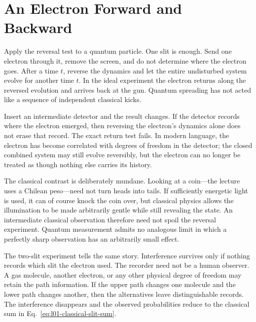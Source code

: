 \section{An Electron Forward and Backward}

Apply the reversal test to a quantum particle. One slit is enough. Send one
electron through it, remove the screen, and do not determine where the
electron goes. After a time \(t\), reverse the dynamics and let the entire
undisturbed system evolve for another time \(t\). In the ideal experiment the
electron returns along the reversed evolution and arrives back at the gun.
Quantum spreading has not acted like a sequence of independent classical
kicks.

Insert an intermediate detector and the result changes. If the detector
records where the electron emerged, then reversing the electron's dynamics
alone does not erase that record. The exact return test fails. In modern
language, the electron has become correlated with degrees of freedom in the
detector; the closed combined system may still evolve reversibly, but the
electron can no longer be treated as though nothing else carries its
history.

The classical contrast is deliberately mundane. Looking at a coin---the
lecture uses a Chilean peso---need not turn heads into tails. If sufficiently
energetic light is used, it can of course knock the coin over, but classical
physics allows the illumination to be made arbitrarily gentle while still
revealing the state. An intermediate classical observation therefore need
not spoil the reversal experiment. Quantum measurement admits no analogous
limit in which a perfectly sharp observation has an arbitrarily small effect.

The two-slit experiment tells the same story. Interference survives only if
nothing records which slit the electron used. The recorder need not be a
human observer. A gas molecule, another electron, or any other physical
degree of freedom may retain the path information. If the upper path changes
one molecule and the lower path changes another, then the alternatives leave
distinguishable records. The interference disappears and the observed
probabilities reduce to the classical sum in
Eq.~\eqref{eq:l01-classical-slit-sum}.

\begin{classroomqa}
\end{classroomqa}

